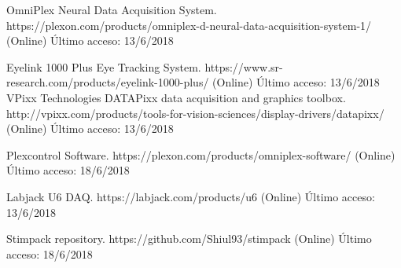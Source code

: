 \documentclass[conference]{IEEEtran}
\begin{document}
\begin{thebibliography}{00}
 OmniPlex Neural Data Acquisition System. https://plexon.com/products/omniplex-d-neural-data-acquisition-system-1/ (Online) Último acceso: 13/6/2018

 Eyelink 1000 Plus Eye Tracking System. https://www.sr-research.com/products/eyelink-1000-plus/ (Online) Último acceso: 13/6/2018
 VPixx Technologies DATAPixx data acquisition and graphics toolbox. http://vpixx.com/products/tools-for-vision-sciences/display-drivers/datapixx/  (Online) Último acceso: 13/6/2018

 Plexcontrol Software. https://plexon.com/products/omniplex-software/ (Online) Último acceso: 18/6/2018

 Labjack U6 DAQ. https://labjack.com/products/u6 (Online) Último acceso: 13/6/2018




 Stimpack repository. https://github.com/Shiul93/stimpack (Online) Último acceso: 18/6/2018

\end{thebibliography}

\vspace{12pt}
\end{document}
